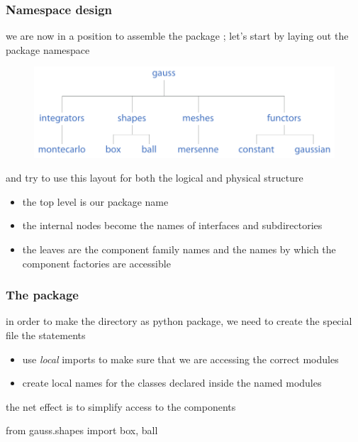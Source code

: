 %
%


\begin{frame}[fragile]
%
  \frametitle{Namespace design}
%
  we are now in a position to assemble the package ; let's start by laying out
  the package namespace
%
  \begin{figure}
    \includegraphics[scale=0.5]{figures/gauss-namespace.pdf}
  \end{figure}
%
  and try to use this layout for both the logical and physical structure
  \begin{itemize}
  \item the top level is our package name
  \item the internal nodes become the names of interfaces and subdirectories
  \item the leaves are the component family names and the names by which the component
    factories are accessible
  \end{itemize}
%
\end{frame}

\begin{frame}[fragile]
%
  \frametitle{The  package}
%
  in order to make the directory  as python package, we need to create
  the special file 
%
%
  the  statements 
  \begin{itemize}
  \item use \emph{local} imports to make sure that we are accessing the correct modules
  \item create local names for the classes declared inside the named modules
  \end{itemize}
%
  the net effect is to simplify access to the components 
%
  \begin{ipython}{}
    from gauss.shapes import box, ball
  \end{ipython}
\end{frame}

